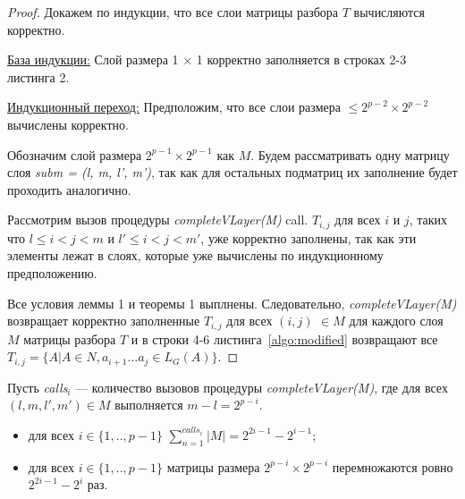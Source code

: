 \documentclass[14pt]{matmex-diploma-custom}
\begin{document}
\begin{proof}

Докажем по индукции, что все слои матрицы разбора $T$ вычисляются корректно.

\underline{База индукции:} Слой размера 1 × 1 корректно заполняется в строках 2-3 листинга 2.

\underline{Индукционный переход:} Предположим, что все слои размера $\le 2^{p - 2} \times 2^{p - 2}$ вычислены корректно.

Обозначим слой размера $2^{p - 1} \times 2^{p - 1}$ как $M$. Будем рассматривать одну матрицу слоя \textit{subm = (l, m, l', m')}, так как для остальных подматриц их заполнение будет проходить аналогично.

Рассмотрим вызов процедуры \textit{completeVLayer(M)} call. 
$T_{i,j}$ для всех $i$ и $j$, таких что $l \leq i < j < m$ и $l' \leq i < j < m'$, уже корректно заполнены, так как эти элементы лежат в слоях, которые уже вычислены по индукционному предположению.

Все условия леммы 1 и теоремы 1 выплнены. Следовательно, \textit{completeVLayer(M)} возвращает корректно заполненные $T_{i, j}$ для всех $(i, j)$ $\in M$ для каждого слоя $M$ матрицы разбора $T$ и в строки 4-6 листинга~\ref{algo:modified} возвращают все $T_{i, j} =  \{ A | A \in N, a_{i + 1} \dots a_{j} \in L_{G}(A)\}$.

\end{proof}

\begin{lemma}
Пусть \textit{calls$_{i}$} --- количество вызовов процедуры \textit{completeVLayer(M)}, где для всех $(l, m, l', m') \in M$ выполняется $m - l = 2^{p - i}$.
\begin{itemize}
 \item для всех $i \in \{ 1, .., p - 1\}$  $\sum_{n=1}^{calls_i}{|M|} = 2^{2i - 1} - 2^{i - 1}$;
 \item для всех $ i \in \{ 1, .., p - 1\}$ матрицы размера $2^{p - i} \times 2^{p - i}$ перемножаются ровно $2^{2i - 1} - 2^{i}$ раз.
\end{itemize}
\end{lemma}
\end{document}
